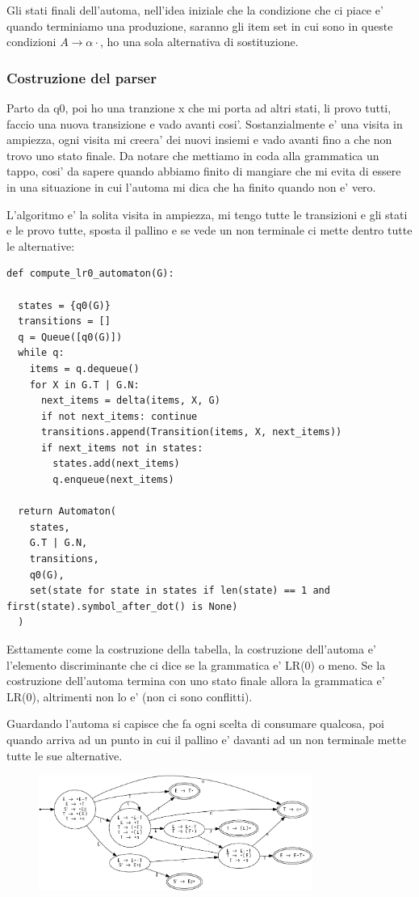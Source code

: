 Gli stati finali dell'automa, nell'idea iniziale che la condizione che ci piace e' quando terminiamo una produzione, saranno gli item set in cui sono in queste condizioni $A \rightarrow \alpha \cdot$, ho una sola alternativa di sostituzione.

\subsubsection{Costruzione del parser}
Parto da q0, poi ho una tranzione x che mi porta ad altri stati, li provo tutti, faccio una nuova transizione e vado avanti cosi'. Sostanzialmente e' una visita in ampiezza, ogni visita mi creera' dei nuovi insiemi e vado avanti fino a che non trovo uno stato finale.
Da notare che mettiamo in coda alla grammatica un tappo, cosi' da sapere quando abbiamo finito di mangiare che mi evita di essere in una situazione in cui l'automa mi dica che ha finito quando non e' vero.

L'algoritmo e' la solita visita in ampiezza, mi tengo tutte le transizioni e gli stati e le provo tutte, sposta il pallino e se vede un non terminale ci mette dentro tutte le alternative:

\begin{lstlisting}
def compute_lr0_automaton(G):

  states = {q0(G)}
  transitions = []
  q = Queue([q0(G)])
  while q:
    items = q.dequeue()
    for X in G.T | G.N:
      next_items = delta(items, X, G)
      if not next_items: continue
      transitions.append(Transition(items, X, next_items))
      if next_items not in states: 
        states.add(next_items)
        q.enqueue(next_items)

  return Automaton(
    states,
    G.T | G.N,
    transitions,
    q0(G),
    set(state for state in states if len(state) == 1 and first(state).symbol_after_dot() is None)
  )
\end{lstlisting}

Esttamente come la costruzione della tabella, la costruzione dell'automa e' l'elemento discriminante che ci dice se la grammatica e' LR(0) o meno. Se la costruzione dell'automa termina con uno stato finale allora la grammatica e' LR(0), altrimenti non lo e' (non ci sono conflitti).

Guardando l'automa si capisce che fa ogni scelta di consumare qualcosa, poi quando arriva ad un punto in cui il pallino e' davanti ad un non terminale mette tutte le sue alternative.

\begin{figure}[ht!]
  \centering
  \includegraphics[width=0.8\textwidth]{images/Parsing/automa.png}
\end{figure}

